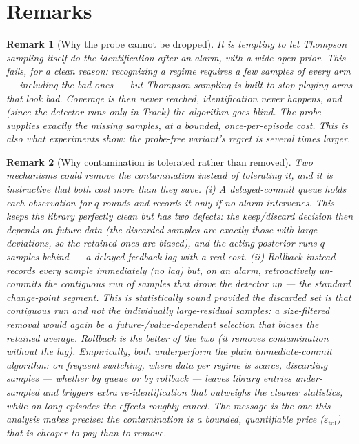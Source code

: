 \documentclass[11pt]{article}
\newtheorem{remark}{Remark}
\newcommand{\etol}{\varepsilon_{\mathrm{tol}}}
\begin{document}
\section{Remarks}

\begin{remark}[Why the probe cannot be dropped]
It is tempting to let Thompson sampling itself do the identification after an alarm, with a wide-open prior. This fails, for a clean reason: recognizing a regime requires a few samples of \emph{every} arm --- including the bad ones --- but Thompson sampling is built to stop playing arms that look bad. Coverage is then never reached, identification never happens, and (since the detector runs only in Track) the algorithm goes blind. The probe supplies exactly the missing samples, at a bounded, once-per-episode cost. This is also what experiments show: the probe-free variant's regret is several times larger.
\end{remark}

\begin{remark}[Why contamination is tolerated rather than removed]
\label{rem:tolerate}
Two mechanisms could remove the contamination instead of tolerating it, and it is instructive that both cost more than they save. \emph{(i) A delayed-commit queue} holds each observation for $q$ rounds and records it only if no alarm intervenes. This keeps the library perfectly clean but has two defects: the keep/discard decision then depends on \emph{future} data (the discarded samples are exactly those with large deviations, so the retained ones are biased), and the acting posterior runs $q$ samples behind --- a delayed-feedback lag with a real cost. \emph{(ii) Rollback} instead records every sample immediately (no lag) but, on an alarm, retroactively un-commits the contiguous run of samples that drove the detector up --- the standard change-point segment. This is statistically sound \emph{provided the discarded set is that contiguous run and not the individually large-residual samples}: a size-filtered removal would again be a future-/value-dependent selection that biases the retained average. Rollback is the better of the two (it removes contamination without the lag). Empirically, both underperform the plain immediate-commit algorithm: on frequent switching, where data per regime is scarce, discarding samples --- whether by queue or by rollback --- leaves library entries under-sampled and triggers extra re-identification that outweighs the cleaner statistics, while on long episodes the effects roughly cancel. The message is the one this analysis makes precise: the contamination is a bounded, quantifiable price ($\etol$) that is cheaper to pay than to remove.
\end{remark}
\end{document}
